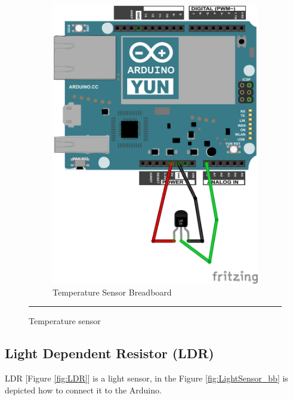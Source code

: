 \documentclass[12pt, a4paper,twoside]{tesi_upf}
\begin{document}
\begin{figure}
\begin{subfigure}[b]{0.3\textwidth}
                \includegraphics[width=\textwidth]{./Figures/Fritzing/TemperatureSensor_bb.png}
                \caption{Temperature Sensor Breadboard}
                \label{fig:TemperatureSensor_bb}
        \end{subfigure}
        \rule{18em}{0.5pt}
        \caption{Temperature sensor}\label{fig:temperaturesensor}
		\end{figure}
      
    \subsection{Light Dependent Resistor (LDR)}
      LDR [Figure \ref{fig:LDR}] is a light sensor, in the Figure \ref{fig:LightSensor_bb} is depicted how to connect it to the Arduino.
      
\end{document}
